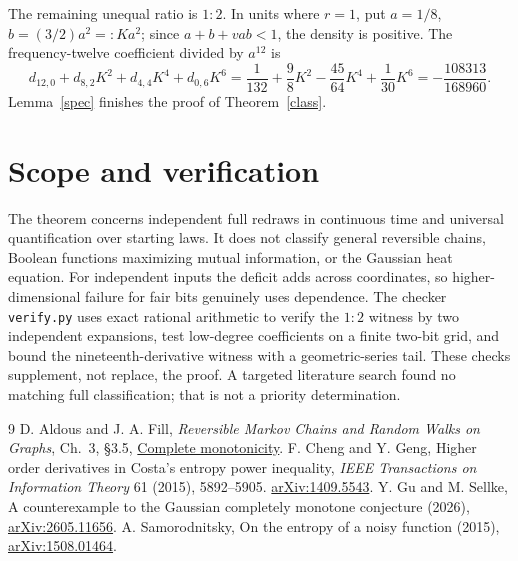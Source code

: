 \documentclass[11pt]{article}
\begin{document}
The remaining unequal ratio is $1:2$. In units where $r=1$,
put $a=1/8$, $b=(3/2)a^2=:Ka^2$; since $a+b+vab<1$, the density
is positive. The frequency-twelve coefficient divided by $a^{12}$ is
\[
 d_{12,0}+d_{8,2}K^2+d_{4,4}K^4+d_{0,6}K^6
 =\frac1{132}+\frac98K^2-\frac{45}{64}K^4+\frac1{30}K^6
 =-\frac{108313}{168960}.
\]
Lemma~\ref{spec} finishes the proof of Theorem~\ref{class}.
\section{Scope and verification}
The theorem concerns independent full redraws in continuous time and
universal quantification over starting laws. It does not classify
general reversible chains, Boolean functions maximizing mutual information,
or the Gaussian heat equation. For independent inputs the deficit adds
across coordinates, so higher-dimensional failure for fair bits genuinely
uses dependence. The checker \texttt{verify.py} uses exact rational
arithmetic to verify the $1:2$ witness by two independent expansions,
test low-degree coefficients on a finite two-bit grid, and bound the
nineteenth-derivative witness with a geometric-series tail. These checks
supplement, not replace, the proof. A targeted literature search found
no matching full classification; that is not a priority determination.
\begin{thebibliography}{9}
 D. Aldous and J. A. Fill, \emph{Reversible Markov Chains
and Random Walks on Graphs}, Ch.~3, \S3.5,
\href{https://www.stat.berkeley.edu/~aldous/RWG/Book_Ralph/Ch3.S5.html}{Complete monotonicity}.
 F. Cheng and Y. Geng, Higher order derivatives in Costa's
entropy power inequality, \emph{IEEE Transactions on Information Theory}
61 (2015), 5892--5905. \href{https://arxiv.org/abs/1409.5543}{arXiv:1409.5543}.
 Y. Gu and M. Sellke, A counterexample to the Gaussian
completely monotone conjecture (2026),
\href{https://arxiv.org/abs/2605.11656}{arXiv:2605.11656}.
 A. Samorodnitsky, On the entropy of a noisy function (2015),
\href{https://arxiv.org/abs/1508.01464}{arXiv:1508.01464}.
\end{thebibliography}
\end{document}
